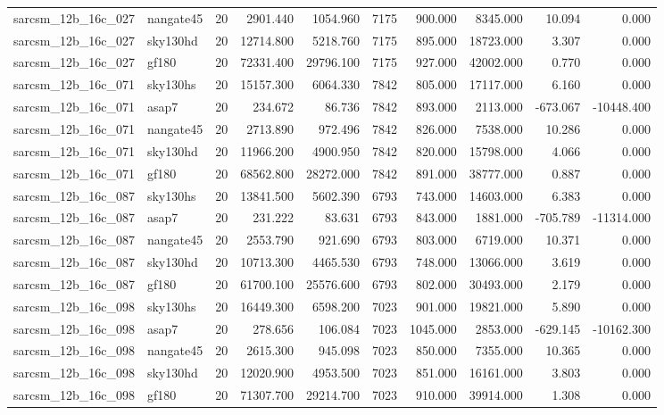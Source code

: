 \documentclass{article}
\begin{document}
\begin{longtable}{llrrrrrrrr}
sarcsm\_12b\_16c\_027 & nangate45 & 20 & 2901.440 & 1054.960 & 7175 & 900.000 & 8345.000 & 10.094 & 0.000 \\
sarcsm\_12b\_16c\_027 & sky130hd & 20 & 12714.800 & 5218.760 & 7175 & 895.000 & 18723.000 & 3.307 & 0.000 \\
sarcsm\_12b\_16c\_027 & gf180 & 20 & 72331.400 & 29796.100 & 7175 & 927.000 & 42002.000 & 0.770 & 0.000 \\
sarcsm\_12b\_16c\_071 & sky130hs & 20 & 15157.300 & 6064.330 & 7842 & 805.000 & 17117.000 & 6.160 & 0.000 \\
sarcsm\_12b\_16c\_071 & asap7 & 20 & 234.672 & 86.736 & 7842 & 893.000 & 2113.000 & -673.067 & -10448.400 \\
sarcsm\_12b\_16c\_071 & nangate45 & 20 & 2713.890 & 972.496 & 7842 & 826.000 & 7538.000 & 10.286 & 0.000 \\
sarcsm\_12b\_16c\_071 & sky130hd & 20 & 11966.200 & 4900.950 & 7842 & 820.000 & 15798.000 & 4.066 & 0.000 \\
sarcsm\_12b\_16c\_071 & gf180 & 20 & 68562.800 & 28272.000 & 7842 & 891.000 & 38777.000 & 0.887 & 0.000 \\
sarcsm\_12b\_16c\_087 & sky130hs & 20 & 13841.500 & 5602.390 & 6793 & 743.000 & 14603.000 & 6.383 & 0.000 \\
sarcsm\_12b\_16c\_087 & asap7 & 20 & 231.222 & 83.631 & 6793 & 843.000 & 1881.000 & -705.789 & -11314.000 \\
sarcsm\_12b\_16c\_087 & nangate45 & 20 & 2553.790 & 921.690 & 6793 & 803.000 & 6719.000 & 10.371 & 0.000 \\
sarcsm\_12b\_16c\_087 & sky130hd & 20 & 10713.300 & 4465.530 & 6793 & 748.000 & 13066.000 & 3.619 & 0.000 \\
sarcsm\_12b\_16c\_087 & gf180 & 20 & 61700.100 & 25576.600 & 6793 & 802.000 & 30493.000 & 2.179 & 0.000 \\
sarcsm\_12b\_16c\_098 & sky130hs & 20 & 16449.300 & 6598.200 & 7023 & 901.000 & 19821.000 & 5.890 & 0.000 \\
sarcsm\_12b\_16c\_098 & asap7 & 20 & 278.656 & 106.084 & 7023 & 1045.000 & 2853.000 & -629.145 & -10162.300 \\
sarcsm\_12b\_16c\_098 & nangate45 & 20 & 2615.300 & 945.098 & 7023 & 850.000 & 7355.000 & 10.365 & 0.000 \\
sarcsm\_12b\_16c\_098 & sky130hd & 20 & 12020.900 & 4953.500 & 7023 & 851.000 & 16161.000 & 3.803 & 0.000 \\
sarcsm\_12b\_16c\_098 & gf180 & 20 & 71307.700 & 29214.700 & 7023 & 910.000 & 39914.000 & 1.308 & 0.000 \\

\end{longtable}
\end{document}

